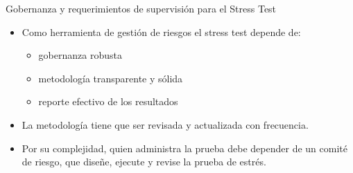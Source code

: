\documentclass{beamer}
\begin{document}
\begin{frame}{Gobernanza y requerimientos de supervisi\'on para el Stress Test}
\begin{itemize}
    \item Como herramienta de gesti\'on de riesgos el stress test depende de:
    \begin{itemize}
        \item gobernanza robusta
        \item metodolog\'ia transparente y s\'olida
        \item reporte efectivo de los resultados 
    \end{itemize}
    \item La metodolog\'ia tiene que ser revisada y actualizada con frecuencia.
    \item Por su complejidad, quien administra la prueba debe depender de un comit\'e  de riesgo, que diseñe, ejecute y revise la prueba de estr\'es.
    
\end{itemize}
    
\end{frame}
\end{document}
